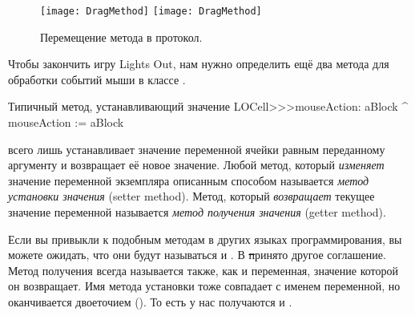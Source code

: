 \documentclass[a4paper,10pt,twoside]{book}
\begin{document}
{\begin{figure}[htbp]
   \centering
   \ifluluelse
		{\texttt{[image: DragMethod]} }
		{\texttt{[image: DragMethod]} }
   \caption{Перемещение метода в протокол.}
\end{figure}

Чтобы закончить игру Lights Out, нам нужно определить ещё два метода для обработки событий мыши в классе .
\begin{method}[mouseAction:]{Типичный метод, устанавливающий значение}
LOCell>>>mouseAction: aBlock
   ^ mouseAction := aBlock
\end{method}

 всего лишь устанавливает значение переменной ячейки  равным переданному аргументу и возвращает её новое значение.
Любой метод, который \emph{изменяет} значение переменной экземпляра описанным способом называется \emph{метод установки значения} (setter method). Метод, который \emph{возвращает} текущее значение переменной называется \emph{метод получения значения} (getter method).

Если вы привыкли к подобным методам в других языках программирования, вы можете ожидать, что они будут называться  и .
В \st принято другое соглашение.
Метод получения всегда называется также, как и переменная, значение которой он возвращает. Имя метода установки тоже совпадает с именем переменной, но оканчивается двоеточием (\ct{:}). То есть у нас получаются  и .

}
\end{document}
